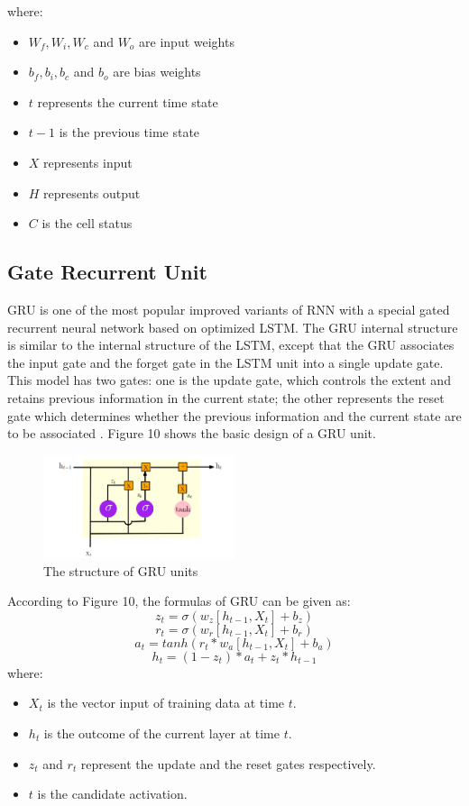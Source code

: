 \documentclass{ieeeojies}
\begin{document}
where:
\begin{itemize}
    \item $W_f, W_i, W_c$ and $W_o$ are input weights
    \item $b_f, b_i, b_c$ and $b_o$ are bias weights
    \item $t$ represents the current time state
    \item $t - 1$ is the previous time state
    \item $X$ represents input
    \item $H$ represents output
    \item $C$ is the cell status
\end{itemize}
\subsection{Gate Recurrent Unit}
GRU is one of the most popular improved variants of RNN with a special gated recurrent neural network based on optimized LSTM. The GRU internal structure is similar to the internal structure of the LSTM, except that the GRU associates the input gate and the forget gate in the LSTM unit into a single update gate. This model has two gates: one is the update gate, which controls the extent and retains previous information in the current state; the other represents the reset gate which determines whether the previous information and the current state are to be associated \cite{b14}. Figure 10 shows the basic design of a GRU unit.
\begin{figure} [H]
    \centering
    \includegraphics[width=0.5\textwidth]{bibliography/Figure/GRU.png}
    \caption{The structure of GRU units}
    \label{fig:GRU structure}
\end{figure}
According to Figure 10, the formulas of GRU can be given as:
\begin{equation}
    z_t = \sigma(w_z[h_{t - 1}, X_t] + b_z)
\end{equation}
\begin{equation}
    r_t = \sigma(w_r[h_{t - 1}, X_t] + b_r)
\end{equation}
\begin{equation}
    a_t = tanh(r_t * w_a[h_{t - 1}, X_t] + b_a)
\end{equation}
\begin{equation}
    h_t = (1 - z_t) * a_t + z_t * h_{t - 1}
\end{equation}
where:
\begin{itemize}
    \item $X_t$ is the vector input of training data at time $t$.
    \item $h_t$ is the outcome of the current layer at time $t$.
    \item $z_t$ and $r_t$ represent the update and the reset gates respectively.
    \item $t$ is the candidate activation.
\end{itemize}
\end{document}
